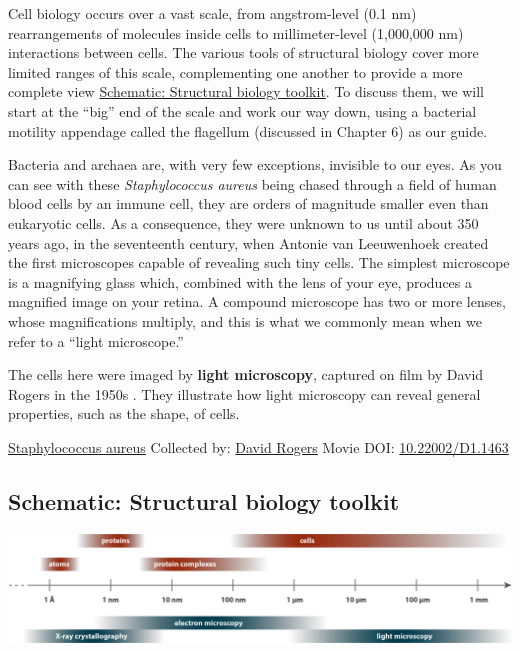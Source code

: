 \documentclass[]{tufte-book}
\begin{document}
Cell biology occurs over a vast scale, from angstrom-level (0.1 nm) rearrangements of molecules inside cells to millimeter-level (1,000,000 nm) interactions between cells. The various tools of structural biology cover more limited ranges of this scale, complementing one another to provide a more complete view \protect\hyperlink{Structural_biology_toolkit}{Schematic: Structural biology toolkit}. To discuss them, we will start at the ``big'' end of the scale and work our way down, using a bacterial motility appendage called the flagellum (discussed in Chapter 6) as our guide.

Bacteria and archaea are, with very few exceptions, invisible to our eyes. As you can see with these \emph{Staphylococcus aureus} being chased through a field of human blood cells by an immune cell, they are orders of magnitude smaller even than eukaryotic cells. As a consequence, they were unknown to us until about 350 years ago, in the seventeenth century, when Antonie van Leeuwenhoek created the first microscopes capable of revealing such tiny cells. The simplest microscope is a magnifying glass which, combined with the lens of your eye, produces a magnified image on your retina. A compound microscope has two or more lenses, whose magnifications multiply, and this is what we commonly mean when we refer to a ``light microscope.''

The cells here were imaged by \textbf{light microscopy}, captured on film by David Rogers in the 1950s \citep{hillInternet}. They illustrate how light microscopy can reveal general properties, such as the shape, of cells.



\hypertarget{htmlwidget-c7951e259cfbdc243061}{}

\label{fig:1-1}\protect\hyperlink{tree}{Staphylococcus aureus} Collected by: \protect\hyperlink{david_rogers}{David Rogers} Movie DOI: \href{https://doi.org/10.22002/D1.1463}{10.22002/D1.1463}

\hypertarget{Structural_biology_toolkit}{%
\subsection*{Schematic: Structural biology toolkit}\label{Structural_biology_toolkit}}

\includegraphics[width=38.54in]{img/schematics/1_1_1}
\end{document}
